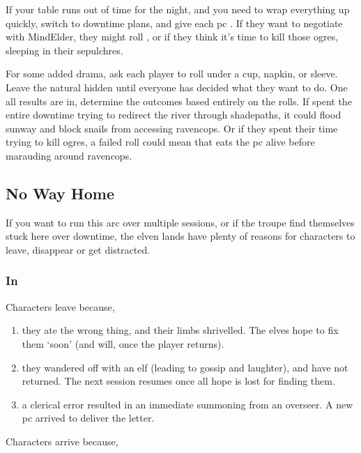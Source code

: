 \begin{multicols}{2}
{  If your table runs out of time for the night, and you need to wrap everything up quickly, switch to \gls{downtime} plans, and give each \gls{pc} .
  If they want to negotiate with \gls{MindElder}, they might roll , or if they think it's time to kill those \glspl{ogre}, sleeping in their \glspl{sepulchre}.

  For some added drama, ask each player to roll under a cup, napkin, or sleeve.
  Leave the \gls{natural} hidden until everyone has decided what they want to do.
  One all results are in, determine the outcomes based entirely on the rolls.
  If  spent the entire \gls{downtime} trying to redirect the river through \gls{shadepaths}, it could \gls{flood} \gls{sunway} and block snails from accessing \gls{ravencops}.
  Or if they spent their time trying to kill \glspl{ogre}, a failed roll could mean that  eats the \gls{pc} alive before marauding around \gls{ravencops}.
}{

  \subsection{No Way Home}

  If you want to run this arc over multiple sessions, or if the troupe find themselves stuck here over \gls{downtime}, the elven lands have plenty of reasons for characters to leave, disappear or get distracted.

  \subsubsection{In }

  Characters leave because,

  \begin{enumerate}
    \item
    they ate the wrong thing, and their limbs shrivelled.
    The elves hope to fix them `soon' (and will, once the player returns).
    \item
    they wandered off with an elf (leading to gossip and laughter), and have not returned.
    The next session resumes once all hope is lost for finding them.
    \item
    a clerical error resulted in an immediate summoning from an overseer.
    A new \gls{pc} arrived to deliver the letter.
  \end{enumerate}

  Characters arrive because,

}
\end{multicols}
